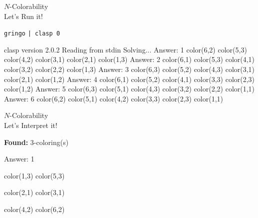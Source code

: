 \begin{frame}[fragile]{$N$-Colorability\\
              \normalsize Let's \alert{Run} it!}
\begin{block}{\alert<1>{\lstinline{gringo}   \lstinline{| clasp 0}}}
\vspace*{-4mm}
\pause\footnotesize%
\begin{semiverbatim}
clasp version 2.0.2
Reading from stdin
Solving...
Answer: 1
color(6,2) color(5,3) color(4,2) color(3,1) color(2,1) color(1,3)
Answer: 2
color(6,1) color(5,3) color(4,1) color(3,2) color(2,2) color(1,3)
Answer: 3
color(6,3) color(5,2) color(4,3) color(3,1) color(2,1) color(1,2)
Answer: 4
color(6,1) color(5,2) color(4,1) color(3,3) color(2,3) color(1,2)
Answer: 5
color(6,3) color(5,1) color(4,3) color(3,2) color(2,2) color(1,1)
Answer: 6
color(6,2) color(5,1) color(4,2) color(3,3) color(2,3) color(1,1)
\end{semiverbatim}
\end{block}
\end{frame}
\begin{frame}[fragile]{$N$-Colorability\\
              \normalsize Let's \alert{Interpret} it!}
\begin{block}{{\textbf{Found:} $3$-coloring(s)}}
\begin{minipage}[t]{0.48\linewidth}
\begin{semiverbatim}
Answer: 1

\alert<2>{color(1,3) color(5,3)}

\alert<3>{color(2,1) color(3,1)}

\alert<4>{color(4,2) color(6,2)}
\end{semiverbatim}
\end{minipage}
\begin{minipage}[t]{0.45\linewidth}

\end{minipage}
\end{block}
\end{frame}
